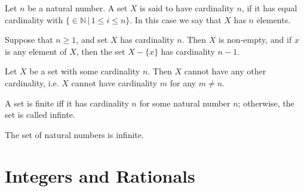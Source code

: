 \documentclass{article}
\begin{document}
\begin{definition}[Cardinality \(n\)]
	Let \(n\) be a natural number. A set \(X\) is said to have cardinality \(n\), if it has equal cardinality with \(\{\in\mathbb{N}\,|\,1\leq i\leq n\}\). In this case we say that \(X\) has \(n\) elements.
\end{definition}
\begin{lemma}
	Suppose that \(n\geq 1\), and set \(X\) has cardinality \(n\). Then \(X\) is non-empty, and if \(x\) is any element of \(X\), then the set \(X-\{x\}\) has cardinality \(n-1\).
\end{lemma}
\begin{proposition}
	Let \(X\) be a set with some cardinality \(n\). Then \(X\) cannot have any other cardinality, i.e. \(X\) cannot have cardinality \(m\) for any \(m\neq n\).
\end{proposition}
\begin{definition}
	A set is finite iff it has cardinality \(n\) for some natural number \(n\); otherwise, the set is called infinte.
\end{definition}
\begin{theorem}
	The set of natural numbers is infinite.
\end{theorem}
\section{Integers and Rationals}
\end{document}
